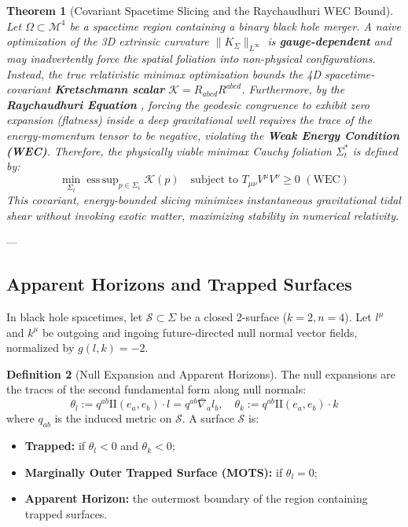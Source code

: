 \documentclass[11pt,reqno]{amsart}
\newtheorem{theorem}{Theorem}[section]
\theoremstyle{definition}
\newtheorem{definition}[theorem]{Definition}
\providecommand{\II}{\mathrm{I\!I}}
\numberwithin{equation}{section}
\providecommand{\II}{\mathrm{II}}
\begin{document}
\begin{theorem}[Covariant Spacetime Slicing and the Raychaudhuri WEC Bound]
Let $\Omega \subset \mathcal{M}^4$ be a spacetime region containing a binary black hole merger. A naive optimization of the 3D extrinsic curvature $\|K_\Sigma\|_{L^\infty}$ is \textbf{gauge-dependent} and may inadvertently force the spatial foliation into non-physical configurations. Instead, the true relativistic minimax optimization bounds the 4D spacetime-covariant \textbf{Kretschmann scalar} $\mathcal{K} = R_{abcd}R^{abcd}$. 
Furthermore, by the \textbf{Raychaudhuri Equation} \cite{raychaudhuri1955}, forcing the geodesic congruence to exhibit zero expansion (flatness) inside a deep gravitational well requires the trace of the energy-momentum tensor to be negative, violating the \textbf{Weak Energy Condition (WEC)}. Therefore, the physically viable minimax Cauchy foliation $\Sigma_t^*$ is defined by:
\begin{equation}
\min_{\Sigma_t} \operatorname{ess\,sup}_{p \in \Sigma_t} \mathcal{K}(p) \quad \text{subject to } T_{\mu\nu}V^\mu V^\nu \ge 0 \,\, (\text{WEC})
\end{equation}
This covariant, energy-bounded slicing minimizes instantaneous gravitational tidal shear without invoking exotic matter, maximizing stability in numerical relativity.
\end{theorem}

---

\subsection{Apparent Horizons and Trapped Surfaces}
In black hole spacetimes, let $\mathcal{S} \subset \Sigma$ be a closed 2-surface ($k=2, n=4$). Let $l^\mu$ and $k^\mu$ be outgoing and ingoing future-directed null normal vector fields, normalized by $g(l, k) = -2$.

\begin{definition}[Null Expansion and Apparent Horizons]
The null expansions are the traces of the second fundamental form along null normals:
\begin{equation}
\theta_l := q^{ab} \II(e_a, e_b) \cdot l = q^{ab} \bar{\nabla}_a l_b, \quad \theta_k := q^{ab} \II(e_a, e_b) \cdot k
\end{equation}
where $q_{ab}$ is the induced metric on $\mathcal{S}$. A surface $\mathcal{S}$ is:
\begin{itemize}
    \item \textbf{Trapped:} if $\theta_l < 0$ and $\theta_k < 0$;
    \item \textbf{Marginally Outer Trapped Surface (MOTS):} if $\theta_l = 0$;
    \item \textbf{Apparent Horizon:} the outermost boundary of the region containing trapped surfaces.
\end{itemize}
\end{definition}
\end{document}

